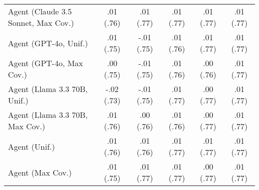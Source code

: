 \begin{table}[h!]
\begin{tabular}{lccccc}
    Agent (Claude 3.5 Sonnet, Max Cov.) & \cellcolor{gold!30}.01 {\small (.76)} & \cellcolor{silver!30}.01 {\small (.77)} & .01 {\small (.77)} & .01 {\small (.77)} & .01 {\small (.77)} \\
    Agent (GPT-4o, Unif.) & .01 {\small (.75)} & -.01 {\small (.75)} & .01 {\small (.76)} & .01 {\small (.77)} & \cellcolor{bronze!30}.01 {\small (.77)} \\
    Agent (GPT-4o, Max Cov.) & .00 {\small (.75)} & -.01 {\small (.75)} & .01 {\small (.76)} & .00 {\small (.76)} & .01 {\small (.77)} \\
    Agent (Llama 3.3 70B, Unif.) & -.02 {\small (.73)} & -.01 {\small (.75)} & .01 {\small (.77)} & .00 {\small (.77)} & .01 {\small (.77)} \\
    Agent (Llama 3.3 70B, Max Cov.) & \cellcolor{silver!30}.01 {\small (.76)} & .00 {\small (.76)} & .01 {\small (.76)} & .00 {\small (.77)} & .01 {\small (.77)} \\
    Agent (Unif.) & .01 {\small (.76)} & .01 {\small (.76)} & \cellcolor{bronze!30}.01 {\small (.77)} & \cellcolor{bronze!30}.01 {\small (.77)} & .01 {\small (.77)} \\
    Agent (Max Cov.) & .01 {\small (.75)} & \cellcolor{bronze!30}.01 {\small (.77)} & .01 {\small (.77)} & .00 {\small (.77)} & \cellcolor{bronze!30}.01 {\small (.77)} \\
    \bottomrule
    \end{tabular}
\end{table}